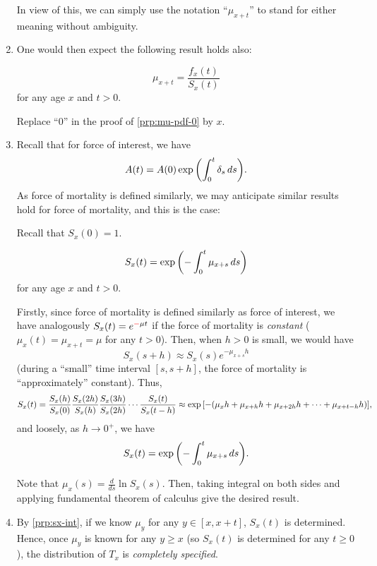 \begin{enumerate}
In view of this, we can simply use the notation ``\(\mu_{x+t}\)'' to stand for
either meaning without ambiguity.

\item One would then expect the following result holds also:
\begin{proposition}
\label{prp:mu-pdf-x}
\[
\mu_{x+t}=\frac{f_x(t)}{S_x(t)}
\]
for any age \(x\) and \(t>0\).
\end{proposition}
\begin{pf}
Replace ``0'' in the proof of \cref{prp:mu-pdf-0} by \(x\).
\end{pf}

\item Recall that for force of interest, we have
\[
A(t)=A(0)\exp\qty(\int_{0}^{t}\delta_s\,ds).
\]
As force of mortality is defined similarly, we may anticipate similar results
hold for force of mortality, and this is the case:
\begin{note}
Recall that \(S_x(0)=1\).
\end{note}
\begin{proposition}
\label{prp:sx-int}
\[
S_x(t)=\exp\qty(-\int_{0}^{t}\mu_{x+s}\,ds)
\]
for any age \(x\) and \(t>0\).
\end{proposition}

\begin{intuition}
Firstly, since force of mortality is defined similarly as force of interest, we
have analogously \(S_x(t)=e^{{\color{red}-}\mu t}\) if the force of mortality is
\emph{constant} (\(\mu_x(t)=\mu_{x+t}=\mu\) for any \(t>0\)). Then, when
\(h>0\) is small, we would have
\[
S_x(s+h)\approx S_x(s)e^{-\mu_{x+s} h}
\]
(during a ``small'' time interval \([s, s+h]\), the force of mortality is
``approximately'' constant). Thus,
\[
S_x(t)=\frac{S_x(h)}{S_x(0)}\frac{S_x(2h)}{S_x(h)}\frac{S_x(3h)}{S_x(2h)}\cdots\frac{S_x(t)}{S_x(t-h)}
\approx \exp\qty[-(\mu_{x}h+\mu_{x+h} h+\mu_{x+2h} h+\dotsb+\mu_{x+t-h}h)],
\]
and loosely, as \(h\to 0^+\), we have
\[
S_x(t)=\exp\qty(-\int_{0}^{t}\mu_{x+s}\,ds).
\]
\end{intuition}

\begin{pf}
Note that \(\displaystyle\mu_{x}(s)=\frac{d}{ds}\ln S_x(s)\). Then, taking
integral on both sides and applying fundamental theorem of calculus give the
desired result.
\end{pf}

\item \label{it:fom-spec-dist} By \cref{prp:sx-int}, if we know \(\mu_y\) for
any \(y\in[x, x+t]\), \(S_x(t)\) is determined. Hence, once \(\mu_y\) is known
for any \(y\ge x\) (so \(S_x(t)\) is determined for any \(t\ge 0\)), the
distribution of \(T_x\) is \emph{completely specified}.


\end{enumerate}
